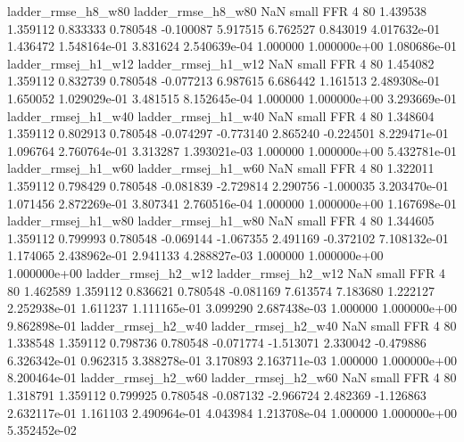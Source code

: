       ladder_rmse_h8_w80       ladder_rmse_h8_w80                   NaN      small      FFR                 4 80 1.439538       1.359112 0.833333       0.780548   -0.100087      5.917515      6.762527     0.843019   4.017632e-01  1.436472 1.548164e-01     3.831624   2.540639e-04            1.000000    1.000000e+00        1.080686e-01
     ladder_rmsej_h1_w12      ladder_rmsej_h1_w12                   NaN      small      FFR                 4 80 1.454082       1.359112 0.832739       0.780548   -0.077213      6.987615      6.686442     1.161513   2.489308e-01  1.650052 1.029029e-01     3.481515   8.152645e-04            1.000000    1.000000e+00        3.293669e-01
     ladder_rmsej_h1_w40      ladder_rmsej_h1_w40                   NaN      small      FFR                 4 80 1.348604       1.359112 0.802913       0.780548   -0.074297     -0.773140      2.865240    -0.224501   8.229471e-01  1.096764 2.760764e-01     3.313287   1.393021e-03            1.000000    1.000000e+00        5.432781e-01
     ladder_rmsej_h1_w60      ladder_rmsej_h1_w60                   NaN      small      FFR                 4 80 1.322011       1.359112 0.798429       0.780548   -0.081839     -2.729814      2.290756    -1.000035   3.203470e-01  1.071456 2.872269e-01     3.807341   2.760516e-04            1.000000    1.000000e+00        1.167698e-01
     ladder_rmsej_h1_w80      ladder_rmsej_h1_w80                   NaN      small      FFR                 4 80 1.344605       1.359112 0.799993       0.780548   -0.069144     -1.067355      2.491169    -0.372102   7.108132e-01  1.174065 2.438962e-01     2.941133   4.288827e-03            1.000000    1.000000e+00        1.000000e+00
     ladder_rmsej_h2_w12      ladder_rmsej_h2_w12                   NaN      small      FFR                 4 80 1.462589       1.359112 0.836621       0.780548   -0.081169      7.613574      7.183680     1.222127   2.252938e-01  1.611237 1.111165e-01     3.099290   2.687438e-03            1.000000    1.000000e+00        9.862898e-01
     ladder_rmsej_h2_w40      ladder_rmsej_h2_w40                   NaN      small      FFR                 4 80 1.338548       1.359112 0.798736       0.780548   -0.071774     -1.513071      2.330042    -0.479886   6.326342e-01  0.962315 3.388278e-01     3.170893   2.163711e-03            1.000000    1.000000e+00        8.200464e-01
     ladder_rmsej_h2_w60      ladder_rmsej_h2_w60                   NaN      small      FFR                 4 80 1.318791       1.359112 0.799925       0.780548   -0.087132     -2.966724      2.482369    -1.126863   2.632117e-01  1.161103 2.490964e-01     4.043984   1.213708e-04            1.000000    1.000000e+00        5.352452e-02
